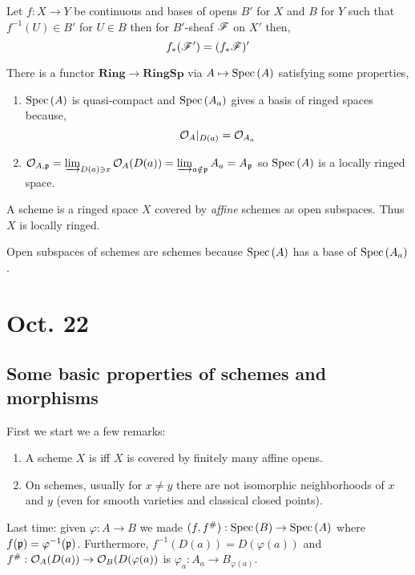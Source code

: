 \documentclass[12pt]{article}
\begin{document}
\begin{lemma}
Let $f : X \to Y$ be continuous and bases of opens $B'$ for $X$ and $B$ for $Y$ such that $f^{-1}(U) \in B'$ for $U \in B$ then for $B'$-sheaf $\mathscr{F}$ on $X'$ then,
\[ f_* (\mathscr{F}') = (f_*\mathscr{F})' \]
\end{lemma}

\begin{cor}
There is a functor $\mathbf{Ring} \to \mathbf{RingSp}$ via $A \mapsto \mathrm{Spec}\left( A \right)$ satisfying some properties,
\begin{enumerate}
\item $\mathrm{Spec}\left( A \right)$ is quasi-compact and $\mathrm{Spec}\left( A_a \right)$ gives a basis of ringed spaces because,
\[ \mathcal{O}_{A}|_{D(a)} = \mathcal{O}_{A_a} \]
\item $\mathcal{O}_{A, \mathfrak{p}} = \varinjlim_{D(a) \ni x} \mathcal{O}_{A}(D(a)) = \varinjlim_{a \notin \mathfrak{p}} A_a = A_{\mathfrak{p}}$ so $\mathrm{Spec}\left( A \right)$ is a locally ringed space.
\end{enumerate}
\end{cor}

\begin{defn}
A scheme is a ringed space $X$ covered by \textit{affine} schemes as open subspaces. Thus $X$ is locally ringed. 
\end{defn}

\begin{rmk}
Open subspaces of schemes are schemes because $\mathrm{Spec}\left( A \right)$ has a base of $\mathrm{Spec}\left( A_a \right)$.
\end{rmk}

\section{Oct. 22}

\subsection{Some basic properties of schemes and morphisms}

\newcommand{\qc}{\text{q-c}\xspace}

First we start we a few remarks:

\begin{enumerate}
\item A scheme $X$ is \qc iff $X$ is covered by finitely many affine opens.
\item On schemes, usually for $x \neq y$ there are not isomorphic neighborhoods of $x$ and $y$ (even for smooth varieties and classical closed points).
\end{enumerate}
\noindent
Last time: given $\varphi : A \to B$ we made $(f, f^\#) : \mathrm{Spec}\left( B \right) \to \mathrm{Spec}\left( A \right)$ where $f(\mathfrak{p}) = \varphi^{-1}(\mathfrak{p})$. Furthermore, $f^{-1}(D(a)) = D(\varphi(a))$ and $f^\# : \mathcal{O}_{A}(D(a)) \to \mathcal{O}_{B}(D(\varphi(a))$ is $\varphi_a : A_a \to B_{\varphi(a)}$.
\end{document}
